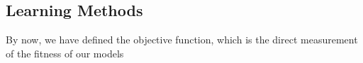 \subsection {Learning Methods}
By now, we have defined the objective function, which is the direct measurement of the fitness of our models